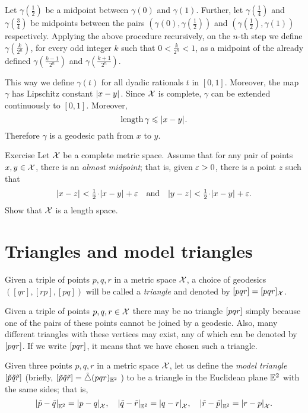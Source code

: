 Let $\gamma(\tfrac12)$ be a midpoint between $\gamma(0)$ and $\gamma(1)$.
Further, let $\gamma(\frac14)$ 
and $\gamma(\frac34)$ be midpoints between the pairs $(\gamma(0),\gamma(\tfrac12))$ 
and $(\gamma(\tfrac12),\gamma(1))$ respectively.
Applying the above procedure recursively,
on the $n$-th step we define $\gamma(\tfrac{k}{2^n})$,
for every odd integer $k$ such that $0<\tfrac k{2^n}<1$, 
as a midpoint of the already defined
$\gamma(\tfrac{k-1}{2^n})$ and $\gamma(\tfrac{k+1}{2^n})$.

This way we define $\gamma(t)$ for all dyadic rationals $t$ in $[0,1]$.
Moreover, the map $\gamma$ has Lipschitz constant $|{x}-{y}|_{}^{{}}$.
Since $\mathcal{X}$ is complete, $\gamma$ can be extended continuously to $[0,1]$.
Moreover,
\[
\mathop{\rm length}\nolimits\gamma\leqslant |{x}-{y}|_{}^{{}}.
\]
Therefore $\gamma$ is a geodesic path from $x$ to $y$.
\qedsf

\begin{thm}{Exercise}\label{ex:menger}
Let $\mathcal{X}$ be a complete metric space.
Assume that for any pair of points $x,y\in \mathcal{X}$, 
there is an \emph{almost midpoint};
that is, given $\varepsilon>0$, there is a point $z$ such that 
\[\dist{x}{z}{}<\tfrac12\cdot\dist{x}{y}{}+\eps 
\quad\text{and}\quad
\dist{y}{z}{}<\tfrac12\cdot\dist{x}{y}{}+\eps.\]
Show that $\mathcal{X}$ is a length space.
\end{thm}


\section{Triangles and model triangles}

Given a triple of points $p,q,r$ in a metric space $\mathcal{X}$, a choice of geodesics $([q r], [r p], [p q])$ will be called a \emph{triangle} and denoted by $[pqr]=[pqr]_{\mathcal{X}}$.

Given a triple of points $p,q,r\in \mathcal{X}$ there may be no triangle
$[pqr]$ simply because one of the pairs of these points cannot be joined by a geodesic.
Also, many different triangles with these vertices may exist, any of which can be denoted by $[pqr]$.
If we write $[pqr]$, it means that we have chosen such a triangle.


Given three points $p,q,r$ in a metric space $\mathcal{X}$,
let us define the \emph{model triangle} $[\tilde p\tilde q\tilde r]$ 
(briefly, 
$[\tilde p\tilde q\tilde r]=\tilde\triangle(p q r)_{\mathbb{E}^2}$%
) to be a triangle in the Euclidean plane $\mathbb{E}^2$ with the same sides;
that is,
\[
|{\tilde p}-{\tilde q}|_{\mathbb{E}^2}^{{}}=|{p}-{q}|_{\mathcal{X}}^{{}},
\quad|{\tilde q}-{\tilde r}|_{\mathbb{E}^2}^{{}}=|{q}-{r}|_{\mathcal{X}}^{{}},
\quad|{\tilde r}-{\tilde p}|_{\mathbb{E}^2}^{{}}=|{r}-{p}|_{\mathcal{X}}^{{}}.
\]


